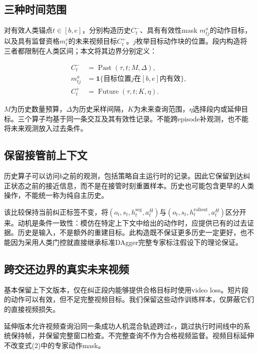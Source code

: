 \documentclass[letterpaper,10pt,conference]{ieeeconf}
\begin{document}
\subsection{三种时间范围}

对有效人类锚点$t\in[b,e]$，分别构造历史$C_t^-$、具有有效性mask $m^a_{tj}$的动作目标，以及具有监督资格$m_t^v$的未来视频目标$C_t^+$。$j$枚举目标动作块的位置。段内构造将三者都限制在人类区间；本文将其边界分别定义：

\begin{equation}
\begin{aligned}
C_t^-&=\operatorname{Past}(\tau,t;M,\Delta),\\
m^a_{tj}&=\mathbf 1\{\text{目标位置}j\text{在}[b,e]\text{内有效}\},\\
C_t^+&=\operatorname{Future}(\tau,t;K,\eta).
\end{aligned}
\end{equation}

$M$为历史数量预算，$\Delta$为历史采样间隔，$K$为未来查询范围，$\eta$选择段内或延伸目标。三个算子均基于同一条交互及其有效性记录。不能跨episode补观测，也不能将未来观测放入过去条件。

\subsection{保留接管前上下文}

历史算子可以访问$b$之前的观测，包括策略自主运行时的记录。因此它保留到达纠正状态之前的接近信息，而不是在接管时刻重置样本。历史也可能包含更早的人类操作，不能统一称为纯自主历史。

该比较保持当前纠正标签不变，将$(o_t,s_t,h_t^{\mathrm{seg}},a_t^H)$与$(o_t,s_t,h_t^{\mathrm{rollout}},a_t^H)$区分开来。动机是条件一致性：模仿在特定上下文中给出的动作时，应提供已有的过去证据。历史是输入，不是额外的重建目标。此构造既不保证更多历史一定更好，也不能因为采用人类门控就直接继承标准DAgger完整专家标注假设下的理论保证。

\subsection{跨交还边界的真实未来视频}

基本保留上下文版本，仅在纠正段内能够提供合格目标时使用video loss。短片段的动作可以有效，但不足完整视频目标。我们保留这些动作训练样本，仅屏蔽它们的直接视频损失。

延伸版本允许视频查询沿同一条成功人机混合轨迹跨过$e$，跳过执行时间线中的系统保持帧，并保留完整窗口检查。不完整查询不作为合格视频监督。视频目标延伸不改变式(2)中的专家动作mask。
\end{document}
